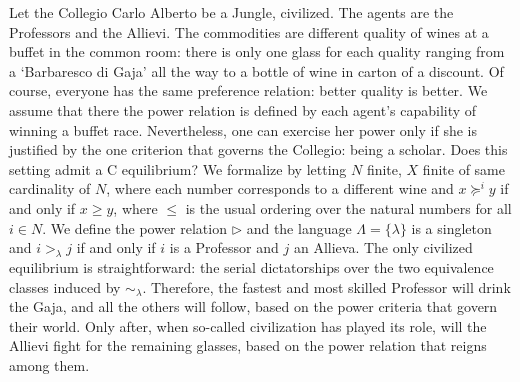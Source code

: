 \begin{example}\label{Example: CCA}
    Let the Collegio Carlo Alberto be a Jungle, civilized. The agents are the Professors and the Allievi. The commodities are different quality of wines at a buffet in the common room: there is only one glass for each quality ranging from a `Barbaresco di Gaja' all the way to a bottle of wine in carton of a discount. Of course, everyone has the same preference relation: better quality is better. We assume that there the power relation is defined by each agent's capability of winning a buffet race. Nevertheless, one can exercise her power only if she is justified by the one criterion that governs the Collegio: being a scholar. Does this setting admit a C equilibrium? We formalize by letting $N$ finite, $X$ finite of same cardinality of $N$, where each number corresponds to a different wine and $x\succeq^i y$ if and only if $x\geq y$, where $\leq$ is the usual ordering over the natural numbers for all $i\in N$. We define the power relation $\triangleright$ and the language $\Lambda=\{\lambda\}$ is a singleton and $i>_{\lambda}j$ if and only if $i$ is a Professor and $j$ an Allieva. The only civilized equilibrium is straightforward: the serial dictatorships over the two equivalence classes induced by $\sim_{\lambda}$. Therefore, the fastest and most skilled Professor will drink the Gaja, and all the others will follow, based on the power criteria that govern their world. Only after, when so-called civilization has played its role, will the Allievi fight for the remaining glasses, based on the power relation that reigns among them. 

\end{example}


    


